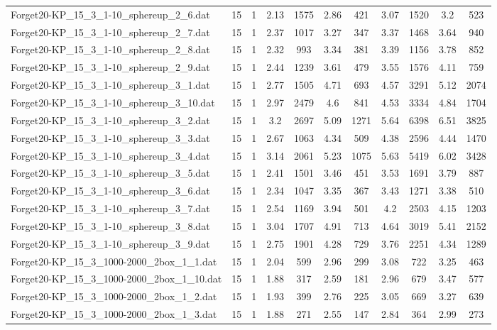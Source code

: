 \begin{table}[!ht]
\begin{tabular}{lcccccccccc}
Forget20-KP\_15\_3\_1-10\_sphereup\_2\_6.dat & 15 & 1 & 2.13 & 1575 & 2.86 & 421 & 3.07 & 1520 & 3.2 & 523 \\
Forget20-KP\_15\_3\_1-10\_sphereup\_2\_7.dat & 15 & 1 & 2.37 & 1017 & 3.27 & 347 & 3.37 & 1468 & 3.64 & 940 \\
Forget20-KP\_15\_3\_1-10\_sphereup\_2\_8.dat & 15 & 1 & 2.32 & 993 & 3.34 & 381 & 3.39 & 1156 & 3.78 & 852 \\
Forget20-KP\_15\_3\_1-10\_sphereup\_2\_9.dat & 15 & 1 & 2.44 & 1239 & 3.61 & 479 & 3.55 & 1576 & 4.11 & 759 \\
Forget20-KP\_15\_3\_1-10\_sphereup\_3\_1.dat & 15 & 1 & 2.77 & 1505 & 4.71 & 693 & 4.57 & 3291 & 5.12 & 2074 \\
Forget20-KP\_15\_3\_1-10\_sphereup\_3\_10.dat & 15 & 1 & 2.97 & 2479 & 4.6 & 841 & 4.53 & 3334 & 4.84 & 1704 \\
Forget20-KP\_15\_3\_1-10\_sphereup\_3\_2.dat & 15 & 1 & 3.2 & 2697 & 5.09 & 1271 & 5.64 & 6398 & 6.51 & 3825 \\
Forget20-KP\_15\_3\_1-10\_sphereup\_3\_3.dat & 15 & 1 & 2.67 & 1063 & 4.34 & 509 & 4.38 & 2596 & 4.44 & 1470 \\
Forget20-KP\_15\_3\_1-10\_sphereup\_3\_4.dat & 15 & 1 & 3.14 & 2061 & 5.23 & 1075 & 5.63 & 5419 & 6.02 & 3428 \\
Forget20-KP\_15\_3\_1-10\_sphereup\_3\_5.dat & 15 & 1 & 2.41 & 1501 & 3.46 & 451 & 3.53 & 1691 & 3.79 & 887 \\
Forget20-KP\_15\_3\_1-10\_sphereup\_3\_6.dat & 15 & 1 & 2.34 & 1047 & 3.35 & 367 & 3.43 & 1271 & 3.38 & 510 \\
Forget20-KP\_15\_3\_1-10\_sphereup\_3\_7.dat & 15 & 1 & 2.54 & 1169 & 3.94 & 501 & 4.2 & 2503 & 4.15 & 1203 \\
Forget20-KP\_15\_3\_1-10\_sphereup\_3\_8.dat & 15 & 1 & 3.04 & 1707 & 4.91 & 713 & 4.64 & 3019 & 5.41 & 2152 \\
Forget20-KP\_15\_3\_1-10\_sphereup\_3\_9.dat & 15 & 1 & 2.75 & 1901 & 4.28 & 729 & 3.76 & 2251 & 4.34 & 1289 \\
Forget20-KP\_15\_3\_1000-2000\_2box\_1\_1.dat & 15 & 1 & 2.04 & 599 & 2.96 & 299 & 3.08 & 722 & 3.25 & 463 \\
Forget20-KP\_15\_3\_1000-2000\_2box\_1\_10.dat & 15 & 1 & 1.88 & 317 & 2.59 & 181 & 2.96 & 679 & 3.47 & 577 \\
Forget20-KP\_15\_3\_1000-2000\_2box\_1\_2.dat & 15 & 1 & 1.93 & 399 & 2.76 & 225 & 3.05 & 669 & 3.27 & 639 \\
Forget20-KP\_15\_3\_1000-2000\_2box\_1\_3.dat & 15 & 1 & 1.88 & 271 & 2.55 & 147 & 2.84 & 364 & 2.99 & 273 \\

\end{tabular}
\end{table}

